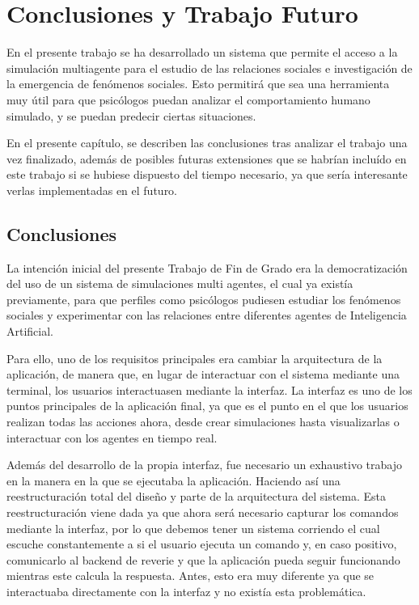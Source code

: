 \chapter{Conclusiones y Trabajo Futuro}
\label{cap:conclusiones}

En el presente trabajo se ha desarrollado un sistema que permite el acceso a la simulación multiagente para el estudio de las relaciones sociales e investigación de la emergencia de fenómenos sociales. Esto permitirá que sea una herramienta muy útil para que psicólogos puedan analizar el comportamiento humano simulado, y se puedan predecir ciertas situaciones.

En el presente capítulo, se describen las conclusiones tras analizar el trabajo una vez finalizado, además de posibles futuras extensiones que se habrían incluído en este trabajo si se hubiese dispuesto del tiempo necesario, ya que sería interesante verlas implementadas en el futuro.

\section{Conclusiones}

La intención inicial del presente Trabajo de Fin de Grado era la democratización del uso de un sistema de simulaciones multi agentes, el cual ya existía previamente, para que perfiles como psicólogos pudiesen estudiar los fenómenos sociales y experimentar con las relaciones entre diferentes agentes de Inteligencia Artificial.

Para ello, uno de los requisitos principales era cambiar la arquitectura de la aplicación, de manera que, en lugar de interactuar con el sistema mediante una terminal, los usuarios interactuasen mediante la interfaz. La interfaz es uno de los puntos principales de la aplicación final, ya que es el punto en el que los usuarios realizan todas las acciones ahora, desde crear simulaciones hasta visualizarlas o interactuar con los agentes en tiempo real.

Además del desarrollo de la propia interfaz, fue necesario un exhaustivo trabajo en la manera en la que se ejecutaba la aplicación. Haciendo así una reestructuración total del diseño y parte de la arquitectura del sistema. Esta reestructuración viene dada ya que ahora será necesario capturar los comandos mediante la interfaz, por lo que debemos tener un sistema corriendo el cual escuche constantemente a si el usuario ejecuta un comando y, en caso positivo, comunicarlo al backend de reverie y que la aplicación pueda seguir funcionando mientras este calcula la respuesta. Antes, esto era muy diferente ya que se interactuaba directamente con la interfaz y no existía esta problemática.

